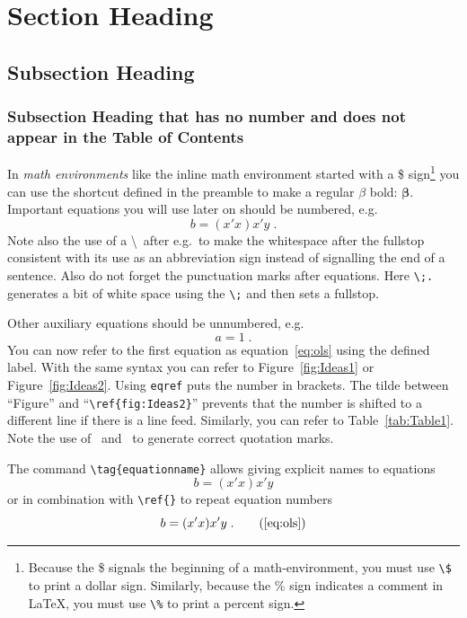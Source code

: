 \documentclass[a4paper,12pt]{scrartcl} %
\newcommand{\bs}{\boldsymbol}  %
\begin{document}
\section{Section Heading} \label{sec:Section1}


\subsection{Subsection Heading}

\subsubsection*{Subsection Heading that has no number and does not appear in the Table of Contents}


In \emph{math environments} like the inline math environment started with a \$ sign\footnote{Because the \$ signals the beginning of a math-environment, you must use \texttt{\textbackslash\$} to print a dollar sign. Similarly, because the \% sign indicates a comment in \LaTeX, you must use \texttt{\textbackslash\%} to print a percent sign.} you can use the shortcut defined in the preamble to make a regular $\beta$ bold: $\bs \beta$. Important equations you will use later on should be numbered, e.g.\
\begin{equation}\label{eq:ols}
   b = (x'x)x'y \;.
\end{equation}
Note also the use of a \textbackslash\ after e.g.\ to make the whitespace after the fullstop consistent with its use as an abbreviation sign instead of signalling the end of a sentence. Also do not forget the punctuation marks after equations. Here \verb|\;.| generates a bit of white space using the \verb|\;| and then sets a fullstop.

Other auxiliary equations should be unnumbered, e.g.\
\begin{equation*}
   a = 1\;.
\end{equation*}
You can now refer to the first equation as equation~\eqref{eq:ols} using the defined label. With the same syntax you can refer to Figure~\ref{fig:Ideas1} or Figure~\ref{fig:Ideas2}. Using \texttt{eqref} puts the number in brackets. The tilde between ``Figure'' and  ``\verb|\ref{fig:Ideas2}|'' prevents that the number is shifted to a different line if there is a line feed. Similarly, you can refer to Table~\ref{tab:Table1}. Note the use of \textasciigrave\textasciigrave\ and \textquotesingle\textquotesingle\ to generate correct quotation marks.

The command \verb|\tag{equationname}| allows giving explicit names to equations
\begin{equation}
   b = (x'x)x'y  \tag{OLS Estimator}
\end{equation}
or in combination with \verb|\ref{}| to repeat equation numbers
\begin{equation}
   b = (x'x)x'y \;. \tag{\ref{eq:ols}}
\end{equation}
\end{document}
